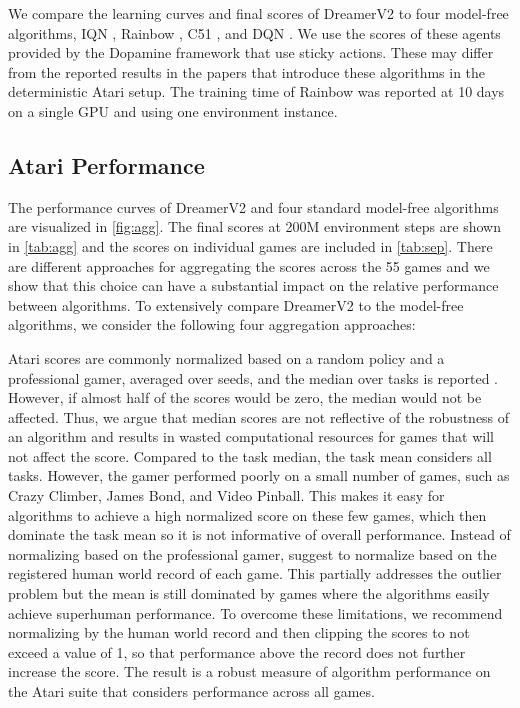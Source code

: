 We compare the learning curves and final scores of DreamerV2 to four model-free algorithms, IQN \citep{dabney2018iqn}, Rainbow \citep{hessel2018rainbow}, C51 \citep{bellemare2017c51}, and DQN \citep{mnih2015dqn}. We use the scores of these agents provided by the Dopamine framework \citep{castro2018dopamine} that use sticky actions. These may differ from the reported results in the papers that introduce these algorithms in the deterministic Atari setup. The training time of Rainbow was reported at 10 days on a single GPU and using one environment instance.

\subsection{Atari Performance}




The performance curves of DreamerV2 and four standard model-free algorithms are visualized in \cref{fig:agg}. The final scores at 200M environment steps are shown in \cref{tab:agg} and the scores on individual games are included in \cref{tab:sep}. There are different approaches for aggregating the scores across the 55 games and we show that this choice can have a substantial impact on the relative performance between algorithms. To extensively compare DreamerV2 to the model-free algorithms, we consider the following four aggregation approaches:

\begin{itemize}
 Atari scores are commonly normalized based on a random policy and a professional gamer, averaged over seeds, and the median over tasks is reported \citep{mnih2015dqn,mnih2016a3c}. However, if almost half of the scores would be zero, the median would not be affected. Thus, we argue that median scores are not reflective of the robustness of an algorithm and results in wasted computational resources for games that will not affect the score.
 Compared to the task median, the task mean considers all tasks. However, the gamer performed poorly on a small number of games, such as Crazy Climber, James Bond, and Video Pinball. This makes it easy for algorithms to achieve a high normalized score on these few games, which then dominate the task mean so it is not informative of overall performance.
 Instead of normalizing based on the professional gamer, \citet{toromanoff2019atarirecords} suggest to normalize based on the registered human world record of each game. This partially addresses the outlier problem but the mean is still dominated by games where the algorithms easily achieve superhuman performance.
 To overcome these limitations, we recommend normalizing by the human world record and then clipping the scores to not exceed a value of 1, so that performance above the record does not further increase the score. The result is a robust measure of algorithm performance on the Atari suite that considers performance across all games.
\end{itemize}

